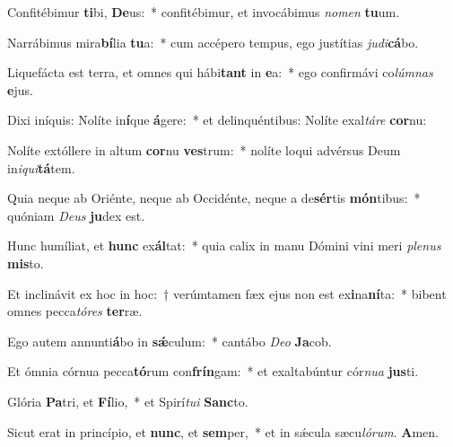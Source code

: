 \item Confitébimur \textbf{ti}bi, \textbf{De}us:~* confitébimur, et invocábimus \textit{no}\textit{men} \textbf{tu}um.
\item Narrábimus mira\textbf{bí}lia \textbf{tu}a:~* cum accépero tempus, ego justítias \textit{ju}\textit{di}\textbf{cá}bo.
\item Liquefácta est terra, et omnes qui hábi\textbf{tant} in \textbf{e}a:~* ego confirmávi co\textit{lúm}\textit{nas} \textbf{e}jus.
\item Dixi iníquis: Nolíte in\textbf{í}que \textbf{á}gere:~* et delinquéntibus: Nolíte exal\textit{tá}\textit{re} \textbf{cor}nu:
\item Nolíte extóllere in altum \textbf{cor}nu \textbf{ves}trum:~* nolíte loqui advérsus Deum in\textit{i}\textit{qui}\textbf{tá}tem.
\item Quia neque ab Oriénte, neque ab Occidénte, neque a de\textbf{sér}tis \textbf{món}tibus:~* quóniam \textit{De}\textit{us} \textbf{ju}dex est.
\item Hunc humíliat, et \textbf{hunc} ex\textbf{ál}tat:~* quia calix in manu Dómini vini meri \textit{ple}\textit{nus} \textbf{mis}to.
\item Et inclinávit ex hoc in hoc:~† verúmtamen fæx ejus non est ex\textbf{i}na\textbf{ní}ta:~* bibent omnes pecca\textit{tó}\textit{res} \textbf{ter}ræ.
\item Ego autem annunti\textbf{á}bo in \textbf{sǽ}culum:~* cantábo \textit{De}\textit{o} \textbf{Ja}cob.
\item Et ómnia córnua pecca\textbf{tó}rum con\textbf{frín}gam:~* et exaltabúntur cór\textit{nu}\textit{a} \textbf{jus}ti.
\item Glória \textbf{Pa}tri, et \textbf{Fí}lio,~* et Spirí\textit{tu}\textit{i} \textbf{Sanc}to.
\item Sicut erat in princípio, et \textbf{nunc}, et \textbf{sem}per,~* et in sǽcula sæcu\textit{ló}\textit{rum}. \textbf{A}men.
